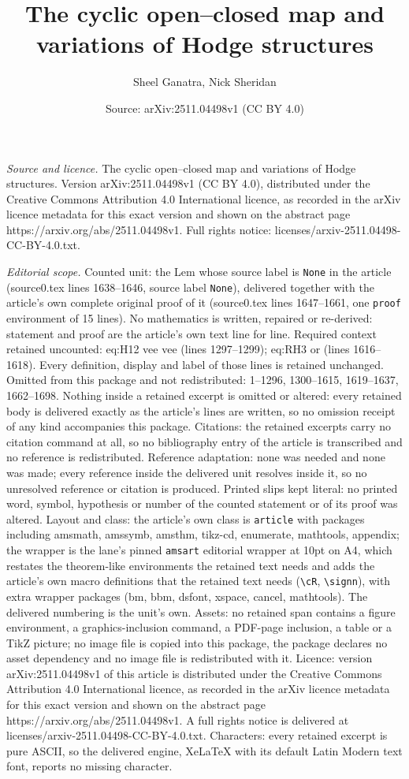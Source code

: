 \documentclass[10pt,a4paper]{amsart}
\title[The cyclic open--closed map and variations of Hodge structur]{The cyclic open--closed map and variations of Hodge structures}
\author{Sheel Ganatra, Nick Sheridan}
\date{Source: arXiv:2511.04498v1 (CC BY 4.0)}
\begin{document}
\maketitle

\noindent\emph{Source and licence.} The cyclic open--closed map and variations of Hodge structures. Version arXiv:2511.04498v1 (CC BY 4.0), distributed under the Creative Commons Attribution 4.0 International licence, as recorded in the arXiv licence metadata for this exact version and shown on the abstract page https://arxiv.org/abs/2511.04498v1. Full rights notice: licenses/arxiv-2511.04498-CC-BY-4.0.txt.\par\smallskip

\noindent\textit{Editorial scope.} Counted unit: the Lem whose source label is \texttt{None} in the article (source0.tex lines 1638--1646, source label \texttt{None}), delivered together with the article's own complete original proof of it (source0.tex lines 1647--1661, one \texttt{proof} environment of 15 lines). No mathematics is written, repaired or re-derived: statement and proof are the article's own text line for line. Required context retained uncounted: eq:H12 vee vee (lines 1297--1299); eq:RH3 or (lines 1616--1618). Every definition, display and label of those lines is retained unchanged. Omitted from this package and not redistributed: 1--1296, 1300--1615, 1619--1637, 1662--1698. Nothing inside a retained excerpt is omitted or altered: every retained body is delivered exactly as the article's lines are written, so no omission receipt of any kind accompanies this package. Citations: the retained excerpts carry no citation command at all, so no bibliography entry of the article is transcribed and no reference is redistributed. Reference adaptation: none was needed and none was made; every reference inside the delivered unit resolves inside it, so no unresolved reference or citation is produced. Printed slips kept literal: no printed word, symbol, hypothesis or number of the counted statement or of its proof was altered. Layout and class: the article's own class is \texttt{article} with packages including amsmath, amssymb, amsthm, tikz-cd, enumerate, mathtools, appendix; the wrapper is the lane's pinned \texttt{amsart} editorial wrapper at 10pt on A4, which restates the theorem-like environments the retained text needs and adds the article's own macro definitions that the retained text needs (\texttt{\textbackslash cR}, \texttt{\textbackslash signn}), with extra wrapper packages (bm, bbm, dsfont, xspace, cancel, mathtools). The delivered numbering is the unit's own. Assets: no retained span contains a figure environment, a graphics-inclusion command, a PDF-page inclusion, a table or a TikZ picture; no image file is copied into this package, the package declares no asset dependency and no image file is redistributed with it. Licence: version arXiv:2511.04498v1 of this article is distributed under the Creative Commons Attribution 4.0 International licence, as recorded in the arXiv licence metadata for this exact version and shown on the abstract page https://arxiv.org/abs/2511.04498v1. A full rights notice is delivered at licenses/arxiv-2511.04498-CC-BY-4.0.txt. Characters: every retained excerpt is pure ASCII, so the delivered engine, XeLaTeX with its default Latin Modern text font, reports no missing character.
\end{document}
